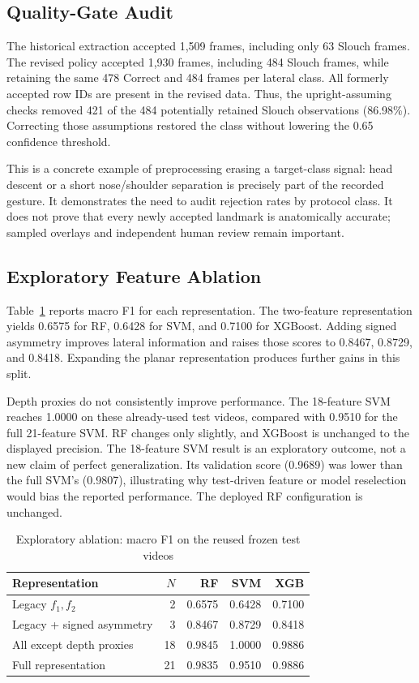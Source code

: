 \documentclass[conference]{IEEEtran}
\newcommand{\smalltable}{\setlength{\tabcolsep}{3.5pt}\renewcommand{\arraystretch}{1.12}\footnotesize}
\begin{document}
\subsection{Quality-Gate Audit}
The historical extraction accepted 1,509 frames, including only 63 Slouch frames. The revised policy accepted 1,930 frames, including 484 Slouch frames, while retaining the same 478 Correct and 484 frames per lateral class. All formerly accepted row IDs are present in the revised data. Thus, the upright-assuming checks removed 421 of the 484 potentially retained Slouch observations (86.98\%). Correcting those assumptions restored the class without lowering the 0.65 confidence threshold.

This is a concrete example of preprocessing erasing a target-class signal: head descent or a short nose/shoulder separation is precisely part of the recorded gesture. It demonstrates the need to audit rejection rates by protocol class. It does not prove that every newly accepted landmark is anatomically accurate; sampled overlays and independent human review remain important.

\subsection{Exploratory Feature Ablation}
Table~\ref{tab:ablation} reports macro F1 for each representation. The two-feature representation yields 0.6575 for RF, 0.6428 for SVM, and 0.7100 for XGBoost. Adding signed asymmetry improves lateral information and raises those scores to 0.8467, 0.8729, and 0.8418. Expanding the planar representation produces further gains in this split.

Depth proxies do not consistently improve performance. The 18-feature SVM reaches 1.0000 on these already-used test videos, compared with 0.9510 for the full 21-feature SVM. RF changes only slightly, and XGBoost is unchanged to the displayed precision. The 18-feature SVM result is an exploratory outcome, not a new claim of perfect generalization. Its validation score (0.9689) was lower than the full SVM's (0.9807), illustrating why test-driven feature or model reselection would bias the reported performance. The deployed RF configuration is unchanged.

\begin{table}[t]\caption{Exploratory ablation: macro F1 on the reused frozen test videos}\label{tab:ablation}\centering\smalltable
\begin{tabular}{lrrrr}\toprule Representation & $N$ & RF & SVM & XGB\\\midrule
Legacy $f_1,f_2$ & 2 & 0.6575 & 0.6428 & 0.7100\\
Legacy + signed asymmetry & 3 & 0.8467 & 0.8729 & 0.8418\\
All except depth proxies & 18 & 0.9845 & 1.0000 & 0.9886\\
Full representation & 21 & 0.9835 & 0.9510 & 0.9886\\\bottomrule
\end{tabular}\end{table}
\end{document}
